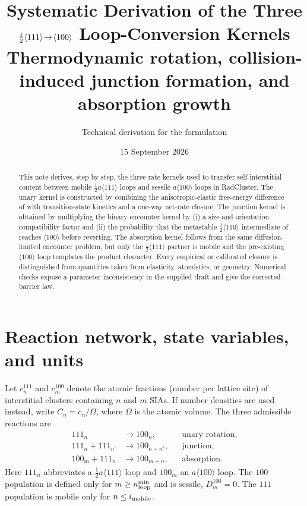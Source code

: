 \documentclass[11pt,a4paper]{article}
\title{\vspace{-1.2cm}\textbf{Systematic Derivation of the Three
$\half\langle111\rangle\!\rightarrow\!\langle100\rangle$ Loop-Conversion Kernels}\\[3pt]
\large Thermodynamic rotation, collision-induced junction formation, and absorption growth}
\author{Technical derivation for the \rc{} formulation}
\date{15 September 2026}
\newcommand{\half}{\tfrac12}
\newcommand{\rc}{\textsf{RadCluster}}
\begin{document}
\maketitle
\vspace{-1em}

\begin{abstract}
This note derives, step by step, the three rate kernels used to transfer
self-interstitial content between mobile $\half a\langle111\rangle$ loops and
sessile $a\langle100\rangle$ loops in \rc.  The unary kernel is constructed by
combining the anisotropic-elastic free-energy difference of
\citet{DudarevBullough2008} with transition-state kinetics and a one-way net-rate
closure.  The junction kernel is obtained by multiplying the binary encounter
kernel by (i) a size-and-orientation compatibility factor and (ii) the
probability that the metastable $\half\langle110\rangle$ intermediate of
\citet{MarianWirth2002} reaches $\langle100\rangle$ before reverting.  The
absorption kernel follows from the same diffusion-limited encounter problem,
but only the $\half\langle111\rangle$ partner is mobile and the pre-existing
$\langle100\rangle$ loop templates the product character.  Every empirical or
calibrated closure is distinguished from quantities taken from elasticity,
atomistics, or geometry.  Numerical checks expose a parameter inconsistency in
the supplied draft and give the corrected barrier law.
\end{abstract}

\section{Reaction network, state variables, and units}
\label{sec:setup}

Let $c_n^{111}$ and $c_m^{100}$ denote the atomic fractions (number per lattice
site) of interstitial clusters containing $n$ and $m$ SIAs.  If number densities
are used instead, write $C_n=c_n/\Omega$, where $\Omega$ is the atomic volume.
The three admissible reactions are
\begin{align}
  111_n &\longrightarrow 100_n,                                      &&\text{unary rotation}, \label{rxn:uni}\\
  111_n+111_{n'} &\longrightarrow 100_{n+n'},                         &&\text{junction},       \label{rxn:junc}\\
  100_m+111_n &\longrightarrow 100_{m+n},                             &&\text{absorption}.     \label{rxn:abs}
\end{align}
Here $111_n$ abbreviates a $\half a\langle111\rangle$ loop and $100_m$ an
$a\langle100\rangle$ loop.  The $100$ population is defined only for
$m\ge n_{\rm loop}^{\min}$ and is sessile, $D_m^{100}=0$.  The $111$ population
is mobile only for $n\le i_{\rm mobile}$.
\end{document}

